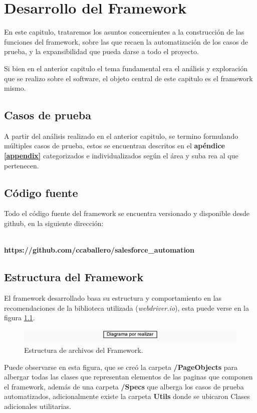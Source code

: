 \chapter{Desarrollo del Framework}

En este capitulo, trataremos los asuntos concernientes a la construcción de las
funciones del framework, sobre las que recaen la automatización de los casos de
prueba, y la expansibilidad que pueda darse a todo el proyecto.

Si bien en el anterior capitulo el tema fundamental era el análisis y
exploración que se realizo sobre el software, el objeto central de este
capitulo es el framework mismo.

\section{Casos de prueba}
A partir del análisis realizado en el anterior capitulo, se termino formulando
múltiples casos de prueba, estos se encuentran descritos en el \textbf{apéndice
\ref{appendix}} categorizados e individualizados según el área y suba rea al que
pertenecen.

\section{Código fuente}
Todo el código fuente del framework se encuentra versionado y disponible desde
github, en la siguiente dirección:
\\
\\
\centerline{\textbf{https://github.com/ccaballero/salesforce\_automation}}

\section{Estructura del Framework}
El framework desarrollado basa su estructura y comportamiento en las
recomendaciones de la biblioteca utilizada (\emph{webdriver.io}), esta puede
verse en la figura \ref{structura}.

\begin{figure}
\centering
\includegraphics[width=1.0\textwidth]{graphics/diagram00.eps}
\caption{Estructura de archivos del Framework.}
\label{structura}
\end{figure}

Puede observarse en esta figura, que se creó la carpeta \textbf{/PageObjects}
para albergar todas las clases que representan elementos de las paginas que
componen el framework, además de una carpeta \textbf{/Specs} que alberga los
casos de prueba automatizados, adicionalmente existe la carpeta \textbf{Utils}
donde se ubicaron Clases adicionales utilitarias.

